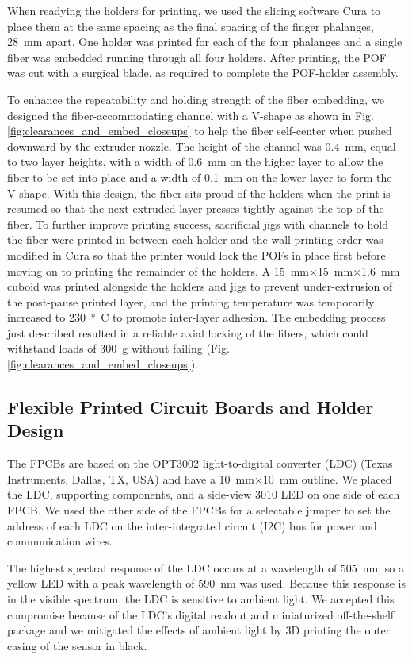 When readying the holders for printing, we used the slicing software Cura to place them at the same spacing as the final spacing of the finger phalanges, \qty{28}{\mm} apart. One holder was printed for each of the four phalanges and a single fiber was embedded running through all four holders. After printing, the POF was cut with a surgical blade, as required to complete the POF-holder assembly. 

To enhance the repeatability and holding strength of the fiber embedding, we designed the fiber-accommodating channel with a V-shape as shown in Fig. \ref{fig:clearances_and_embed_closeups} to help the fiber self-center when pushed downward by the extruder nozzle. The height of the channel was \qty{0.4}{\mm}, equal to two layer heights, with a width of \qty{0.6}{\mm} on the higher layer to allow the fiber to be set into place and a width of \qty{0.1}{\mm} on the lower layer to form the V-shape. With this design, the fiber sits proud of the holders when the print is resumed so that the next extruded layer presses tightly against the top of the fiber. To further improve printing success, sacrificial jigs with channels to hold the fiber were printed in between each holder and the wall printing order was modified in Cura so that the printer would lock the POFs in place first before moving on to printing the remainder of the holders. A \qty{15}{\mm}$\times$\qty{15}{\mm}$\times$\qty{1.6}{\mm} cuboid was printed alongside the holders and jigs to prevent under-extrusion of the post-pause printed layer, and the printing temperature was temporarily increased to \qty{230}{\degree C} to promote inter-layer adhesion. The embedding process just described resulted in a reliable axial locking of the fibers, which could withstand loads of \qty{300}{g} without failing (Fig. \ref{fig:clearances_and_embed_closeups}).

\subsection{Flexible Printed Circuit Boards and Holder Design}
The FPCBs are based on the OPT3002 light-to-digital converter (LDC) (Texas Instruments, Dallas, TX, USA) and have a \qty{10}{\mm}$\times$\qty{10}{\mm} outline. We placed the LDC, supporting components, and a side-view 3010 LED on one side of each FPCB. We used the other side of the FPCBs for a selectable jumper to set the address of each LDC on the inter-integrated circuit (I2C) bus for power and communication wires.   

The highest spectral response of the LDC occurs at a wavelength of \qty{505}{nm}, so a yellow LED with a peak wavelength of \qty{590}{nm} was used. Because this response is in the visible spectrum, the LDC is sensitive to ambient light. We accepted this compromise because of the LDC's digital readout and miniaturized off-the-shelf package and we mitigated the effects of ambient light by 3D printing the outer casing of the sensor in black. 

